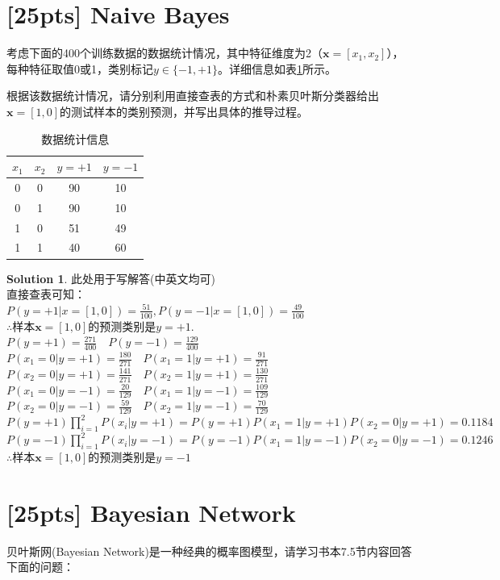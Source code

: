 \documentclass[a4paper,UTF8]{article}
\numberwithin{equation}{section}
\theoremstyle{definition}
\newtheorem*{solution}{Solution}
\begin{document}
\section{[25pts] Naive Bayes}
考虑下面的400个训练数据的数据统计情况，其中特征维度为2（$\mathbf{x}=[x_1,x_2]$），每种特征取值0或1，类别标记$y\in\{-1,+1\}$。详细信息如表\ref{table:training}所示。

根据该数据统计情况，请分别利用直接查表的方式和朴素贝叶斯分类器给出$\mathbf{x}=[1,0]$的测试样本的类别预测，并写出具体的推导过程。
\begin{table}[h]
\centering
\caption{数据统计信息}
\label{table:training}\vspace{2mm}
\begin{tabular}{cc|cc}\hline
$x_1$		&  $x_2$ 	&	$y=+1$	&	$y=-1$ 	\\ \hline
0		&  0 	&	90	&	10 \\
0		&  1 	&	90 	&	10 \\
1		&  0 	&	51 	&	49 \\
1		&  1 	&	40 	&	60 \\\hline
\end{tabular}
\end{table}

\begin{solution}
此处用于写解答(中英文均可)\\
直接查表可知：\\
$P(y=+1|x=[1,0])=\frac{51}{100},P(y=-1|x=[1,0])=\frac{49}{100}$\\
$\therefore$样本$\mathbf{x}=[1,0]$的预测类别是$y=+1$.\\
$P(y=+1)=\frac{271}{400} \quad P(y=-1)=\frac{129}{400}$\\
$P(x_1=0|y=+1)=\frac{180}{271} \quad P(x_1=1|y=+1)=\frac{91}{271}$\\
$P(x_2=0|y=+1)=\frac{141}{271} \quad P(x_2=1|y=+1)=\frac{130}{271}$\\
$P(x_1=0|y=-1)=\frac{20}{129} \quad P(x_1=1|y=-1)=\frac{109}{129}$\\
$P(x_2=0|y=-1)=\frac{59}{129} \quad P(x_2=1|y=-1)=\frac{70}{129}$\\
$P(y=+1)\prod_{i=1}^{2}P(x_i|y=+1)=P(y=+1)P(x_1=1|y=+1)P(x_2=0|y=+1)=0.1184$\\
$P(y=-1)\prod_{i=1}^{2}P(x_i|y=-1)=P(y=-1)P(x_1=1|y=-1)P(x_2=0|y=-1)=0.1246$\\
$\therefore$样本$\mathbf{x}=[1,0]$的预测类别是$y=-1$
\end{solution}

\section{\textbf{[25pts]} Bayesian Network}
贝叶斯网(Bayesian Network)是一种经典的概率图模型，请学习书本7.5节内容回答下面的问题：
\end{document}
